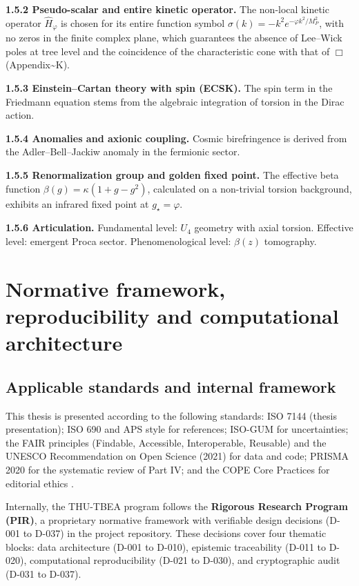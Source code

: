 ﻿\documentclass[11pt,letterpaper]{article}
\begin{document}
\textbf{1.5.2 Pseudo-scalar and entire kinetic operator.} The non-local kinetic operator $\hat{H}_\varphi$ is chosen for its entire function symbol $\sigma(k) = -k^2 e^{-\varphi k^2 / M_P^2}$, with no zeros in the finite complex plane, which guarantees the absence of Lee--Wick poles at tree level and the coincidence of the characteristic cone with that of $\Box$ (Appendix\textasciitilde{}K).

\textbf{1.5.3 Einstein--Cartan theory with spin (ECSK).} The spin term in the Friedmann equation stems from the algebraic integration of torsion in the Dirac action.

\textbf{1.5.4 Anomalies and axionic coupling.} Cosmic birefringence is derived from the Adler--Bell--Jackiw anomaly in the fermionic sector.

\textbf{1.5.5 Renormalization group and golden fixed point.} The effective beta function $\beta(g) = \kappa(1 + g - g^2)$, calculated on a non-trivial torsion background, exhibits an infrared fixed point at $g_\star = \varphi$.

\textbf{1.5.6 Articulation.} Fundamental level: $U_4$ geometry with axial torsion. Effective level: emergent Proca sector. Phenomenological level: $\beta(z)$ tomography.

\section{Normative framework, reproducibility and computational architecture}
\subsection{Applicable standards and internal framework}
This thesis is presented according to the following standards: ISO 7144 (thesis presentation); ISO 690 and APS style for references; ISO-GUM for uncertainties; the FAIR principles (Findable, Accessible, Interoperable, Reusable) and the UNESCO Recommendation on Open Science (2021) for data and code; PRISMA 2020 for the systematic review of Part IV; and the COPE Core Practices for editorial ethics \cite{ISO7144} \cite{ISO690} \cite{ISOGUM} \cite{FAIR2016} \cite{UNESCO2021} \cite{PRISMA2020} \cite{COPE}.

Internally, the THU-TBEA program follows the \textbf{Rigorous Research Program (PIR)}, a proprietary normative framework with verifiable design decisions (D-001 to D-037) in the project repository. These decisions cover four thematic blocks: data architecture (D-001 to D-010), epistemic traceability (D-011 to D-020), computational reproducibility (D-021 to D-030), and cryptographic audit (D-031 to D-037).
\end{document}
